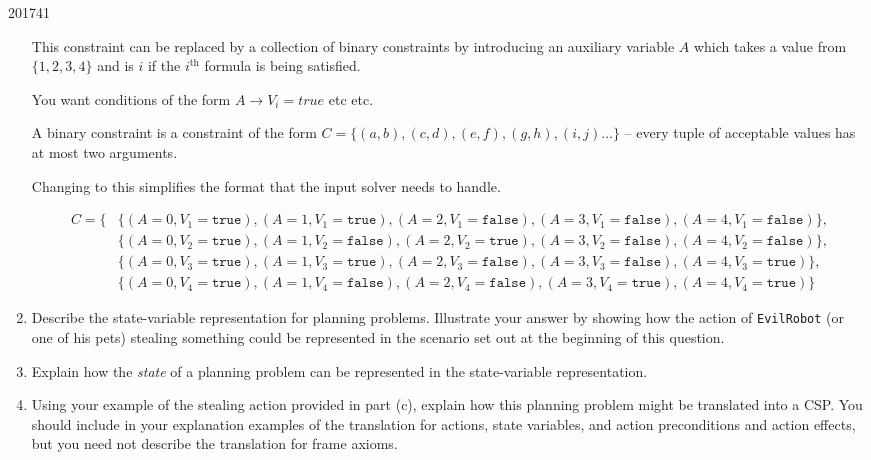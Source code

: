 \documentclass[10pt,\jkfside,a4paper]{article}
\begin{document}
\begin{examquestion}{2017}{4}{1}
\begin{enumerate}[label=(\alph*)]
This constraint can be replaced by a collection of binary constraints by
introducing an auxiliary variable $A$ which takes a value from $\{1, 2, 3,
4\}$ and is $i$ if the $i^{\text{th}}$ formula is being satisfied.

{\color{blue}
You want conditions of the form $A \to V_i = true$ etc etc.

A binary constraint is a constraint of the form $C = \{(a, b), (c, d), (e,
f), (g, h), (i, j) \dots\}$ -- every tuple of acceptable values has at most
two arguments.

Changing to this simplifies the format that the input solver needs to handle.
}

\[
\begin{split}
C = \{&
\{
(A = 0, V_1 = \texttt{true}),
(A = 1, V_1 = \texttt{true}),
(A = 2, V_1 = \texttt{false}),
(A = 3, V_1 = \texttt{false}),
(A = 4, V_1 = \texttt{false})
\}, \\
&
\{
(A = 0, V_2 = \texttt{true}),
(A = 1, V_2 = \texttt{false}),
(A = 2, V_2 = \texttt{true}),
(A = 3, V_2 = \texttt{false}),
(A = 4, V_2 = \texttt{false})
\}, \\
&
\{(A = 0, V_3 = \texttt{true}),
(A = 1, V_3 = \texttt{true}),
(A = 2, V_3 = \texttt{false}),
(A = 3, V_3 = \texttt{false}),
(A = 4, V_3 = \texttt{true})
\}, \\
&
\{(A = 0, V_4 = \texttt{true}),
(A = 1, V_4 = \texttt{false}),
(A = 2, V_4 = \texttt{false}),
(A = 3, V_4 = \texttt{true}),
(A = 4, V_4 = \texttt{true})
\}
\end{split}
\]

\item Describe the state-variable representation for planning problems.
Illustrate your answer by showing how the action of \texttt{EvilRobot} (or one
of his pets) stealing something could be represented in the scenario set out
at the beginning of this question.


\item Explain how the \textit{state} of a planning problem can be
represented in the state-variable representation.


\item Using your example of the stealing action provided in part (c),
explain how this planning problem might be translated into a CSP. You
should include in your explanation examples of the translation for actions,
state variables, and action preconditions and action effects, but you need
not describe the translation for frame axioms.


\end{enumerate}

\end{examquestion}
\end{document}
